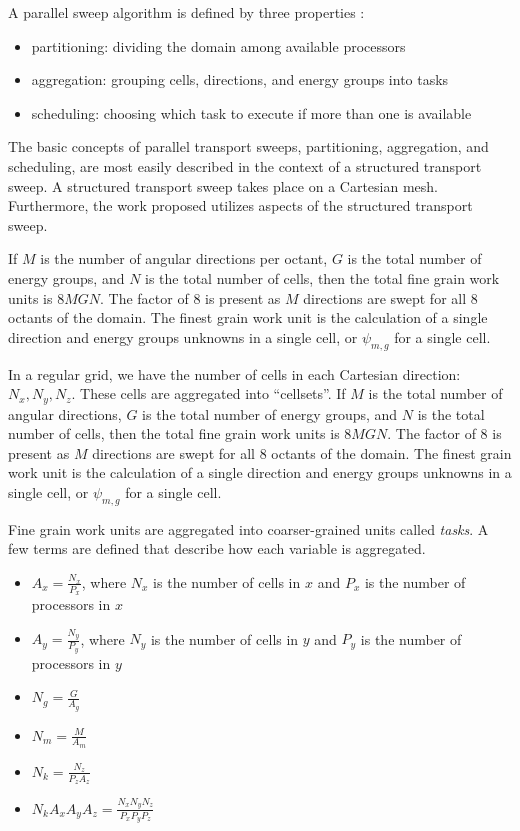 \documentclass{anstrans}
\begin{document}
A parallel sweep algorithm is defined by three properties\cite{mpadams2013} :
\begin{itemize}
\item partitioning: dividing the domain among available processors
\item aggregation: grouping cells, directions, and energy groups into tasks
\item scheduling: choosing which task to execute if more than one is available
\end{itemize}

The basic concepts of parallel transport sweeps, partitioning, aggregation, and scheduling, are most easily described in the context of a structured transport sweep. A structured transport sweep takes place on a Cartesian mesh. Furthermore, the work proposed utilizes aspects of the structured transport sweep.

If $M$ is the number of angular directions per octant, $G$ is the total number of energy groups, and $N$ is the total number of cells, then the total fine grain work units is $8MGN$. The factor of 8 is present as $M$ directions are swept for all 8 octants of the domain. The finest grain work unit is the calculation of a single direction and energy groups unknowns in a single cell, or $\psi_{m,g}$ for a single cell.

In a regular grid, we have the  number of cells in each Cartesian direction: $N_x, N_y, N_z$. These cells are aggregated into ``cellsets''. If $M$ is the total number of angular directions, $G$ is the total number of energy groups, and $N$ is the total number of cells, then the total fine grain work units is $8MGN$. The factor of 8 is present as $M$ directions are swept for all 8 octants of the domain. The finest grain work unit is the calculation of a single direction and energy groups unknowns in a single cell, or $\psi_{m,g}$ for a single cell.

Fine grain work units are aggregated into coarser-grained units called \textit{tasks}. A few terms are defined that describe how each variable is aggregated.
\begin{itemize}
\item $A_x = \frac{N_x}{P_x}$, where $N_x$ is the number of cells in $x$ and $P_x$ is the number of processors in $x$
\item $A_y = \frac{N_y}{P_y}$, where $N_y$ is the number of cells in $y$ and $P_y$ is the number of processors in $y$
\item $N_g = \frac{G}{A_g}$
\item $N_m = \frac{M}{A_m}$
\item $N_k = \frac{N_z}{P_z A_z}$
\item $N_k A_x A_y A_z = \frac{N_x N_y N_z}{P_x P_y P_z}$
\end{itemize}
\end{document}
